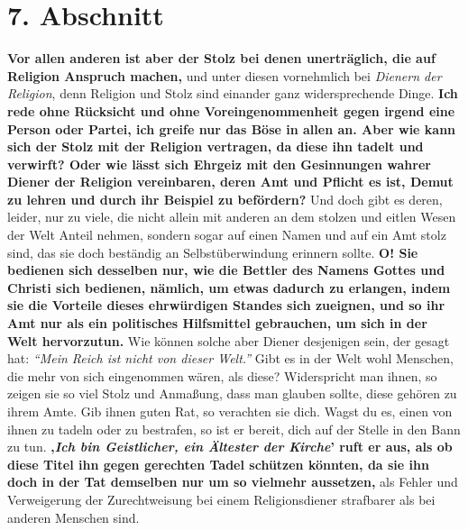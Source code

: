 \section{7. Abschnitt} \label{kap12_ab7}

 \label{ref:12_07_eitle_menschen_religion}
\textbf{Vor allen anderen ist aber der Stolz bei denen
unerträglich, die auf Religion
Anspruch machen,} und unter diesen vornehmlich bei \textit{Dienern der
Religion}, denn
Religion und Stolz sind einander ganz widersprechende Dinge. \textbf{Ich rede
ohne
Rücksicht und ohne Voreingenommenheit gegen irgend eine Person oder Partei, ich
greife nur das Böse in allen an. Aber wie kann sich der Stolz
mit der Religion
vertragen, da diese ihn tadelt und verwirft? Oder wie lässt sich Ehrgeiz mit den
Gesinnungen wahrer Diener der Religion vereinbaren, deren Amt und Pflicht es
ist,
Demut zu lehren und durch ihr Beispiel zu befördern?} Und doch gibt es deren,
leider, nur zu viele, die nicht allein mit anderen an dem stolzen und eitlen
Wesen der Welt Anteil nehmen, sondern sogar auf einen Namen und auf ein Amt
stolz sind, das sie doch beständig an
Selbstüberwindung
erinnern sollte. 
\label{ref:12_07_eitle_menschen_religion_2} \textbf{O! Sie
bedienen sich desselben nur, wie die Bettler des Namens Gottes und Christi sich
bedienen, nämlich, um etwas dadurch zu erlangen, indem sie die Vorteile dieses
ehrwürdigen Standes sich zueignen, und so ihr Amt nur als ein politisches
Hilfsmittel gebrauchen, um sich in der Welt hervorzutun.} Wie können solche
aber
Diener desjenigen sein, der gesagt hat:
\textit{"`Mein Reich ist nicht von dieser
Welt."'}
Gibt es in der Welt wohl Menschen, die mehr von
sich eingenommen wären, als diese? Widerspricht man ihnen, so zeigen sie so viel
Stolz und Anmaßung, dass man glauben sollte, diese gehören zu ihrem Amte. Gib
ihnen guten Rat, so verachten sie dich. Wagst du es, einen von ihnen zu tadeln
oder zu bestrafen, so ist er bereit, dich auf der Stelle in den Bann
zu tun. \label{ref:12_07_eitle_menschen_geislicher}
\textbf{‚\textit{Ich bin Geistlicher, ein Ältester der Kirche}’ ruft er aus,
als ob diese Titel
ihn gegen gerechten Tadel schützen könnten, da sie ihn doch in der Tat
demselben nur um so vielmehr aussetzen,} als Fehler und Verweigerung der
Zurechtweisung bei einem Religionsdiener strafbarer als bei anderen Menschen
sind.

